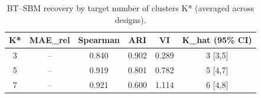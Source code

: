 \begin{table}[!h]
\centering
\caption{BT--SBM recovery by target number of clusters K* (averaged across designs).}
\centering
\begin{tabular}[t]{cccccc}
\toprule
K* & MAE\_rel & Spearman & ARI & VI & K\_hat (95\% CI)\\
\midrule
3 & -- & 0.840 & 0.902 & 0.289 & 3 [3,5]\\
5 & -- & 0.919 & 0.801 & 0.782 & 5 [4,7]\\
7 & -- & 0.921 & 0.600 & 1.114 & 6 [4,8]\\
\bottomrule
\end{tabular}
\end{table}